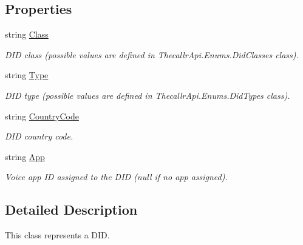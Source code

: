 \subsection*{Properties}
\begin{DoxyCompactItemize}
\item 
string \hyperlink{class_thecallr_api_1_1_objects_1_1_did_1_1_did_a2e04ceee55d81776b998e3ecbe50de7d}{Class}
\begin{DoxyCompactList}\small\item\em D\+I\+D class (possible values are defined in Thecallr\+Api.\+Enums.\+Did\+Classes class). \end{DoxyCompactList}\item 
string \hyperlink{class_thecallr_api_1_1_objects_1_1_did_1_1_did_ad2c75fcb5993b346a96bb04b94f1f0e3}{Type}
\begin{DoxyCompactList}\small\item\em D\+I\+D type (possible values are defined in Thecallr\+Api.\+Enums.\+Did\+Types class). \end{DoxyCompactList}\item 
string \hyperlink{class_thecallr_api_1_1_objects_1_1_did_1_1_did_ad7ac5466b3ef000462a712b9ab826204}{Country\+Code}
\begin{DoxyCompactList}\small\item\em D\+I\+D country code. \end{DoxyCompactList}\item 
string \hyperlink{class_thecallr_api_1_1_objects_1_1_did_1_1_did_ac3096be5d44e343cc14e19c83389e9cc}{App}
\begin{DoxyCompactList}\small\item\em Voice app I\+D assigned to the D\+I\+D (null if no app assigned). \end{DoxyCompactList}\end{DoxyCompactItemize}


\subsection{Detailed Description}
This class represents a D\+I\+D. 



